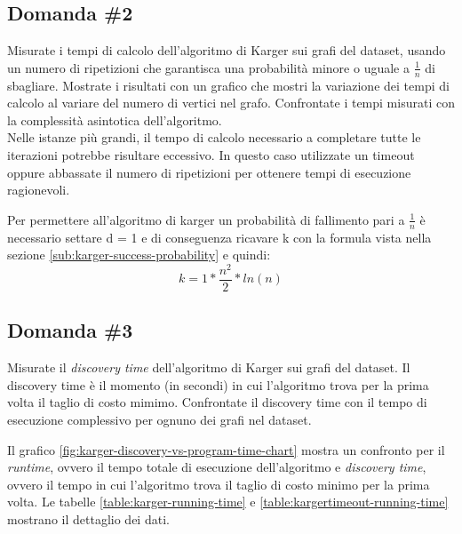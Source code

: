 \subsection{Domanda \#2}
\label{sec:question-2}

\begin{displayquote}
Misurate i tempi di calcolo dell'algoritmo di Karger sui grafi del
dataset, usando un numero di ripetizioni che garantisca una
probabilità minore o uguale a $\frac{1}{n}$ di sbagliare. Mostrate i
risultati con un grafico che mostri la variazione dei tempi di calcolo
al variare del numero di vertici nel grafo. Confrontate i tempi
misurati con la complessità asintotica dell'algoritmo. \\

\noindent Nelle istanze più grandi, il tempo di calcolo necessario a
completare tutte le iterazioni potrebbe risultare eccessivo. In questo
caso utilizzate un timeout oppure abbassate il numero di ripetizioni
per ottenere tempi di esecuzione ragionevoli.
\end{displayquote}

\noindent Per permettere all'algoritmo di karger un probabilità di
fallimento pari a $\frac{1}{n}$ è necessario settare d = 1 e di
conseguenza ricavare k con la formula vista nella sezione
\ref{sub:karger-success-probability} e quindi:
$$ k = 1 * \frac{n^2}{2} * ln(n)$$

\subsection{Domanda \#3}
\label{sec:question-3}

\begin{displayquote}
Misurate il \textit{discovery time} dell'algoritmo di Karger sui grafi
del dataset. Il discovery time è il momento (in secondi) in cui
l'algoritmo trova per la prima volta il taglio di costo mimimo.
Confrontate il discovery time con il tempo di esecuzione complessivo
per ognuno dei grafi nel dataset.
\end{displayquote}

\noindent Il grafico \ref{fig:karger-discovery-vs-program-time-chart}
mostra un confronto per il \emph{runtime}, ovvero il tempo totale di
esecuzione dell'algoritmo e \emph{discovery time}, ovvero il tempo in
cui l'algoritmo trova il taglio di costo minimo per la prima volta.
Le tabelle \ref{table:karger-running-time} e
\ref{table:kargertimeout-running-time} mostrano il dettaglio dei
dati. \\

